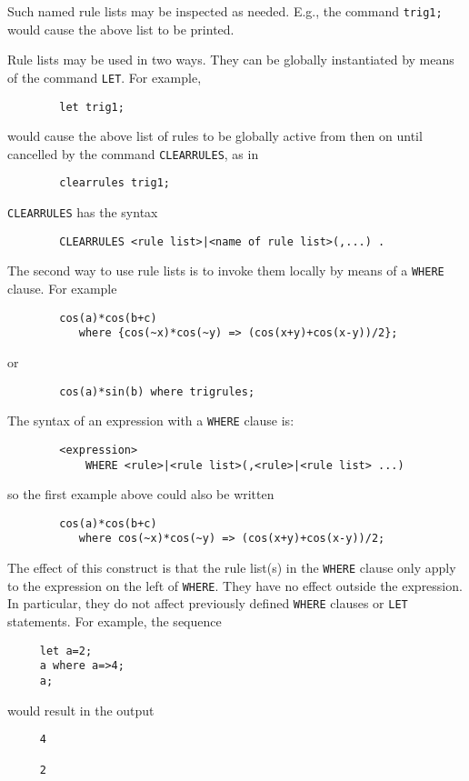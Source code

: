 Such named rule lists may be inspected as needed. E.g., the command
\texttt{trig1;} would cause the above list to be printed.

\hypertarget{CLEARRULES}{}
Rule lists may be used in two ways.  They can be globally instantiated by
means of the command \texttt{LET}. For example,
\begin{verbatim}
        let trig1;
\end{verbatim}
would cause the above list of rules to be globally active from then on until
cancelled by the command \texttt{CLEARRULES}, as in
\begin{verbatim}
        clearrules trig1;
\end{verbatim}
\texttt{CLEARRULES} has the syntax
\begin{verbatim}
        CLEARRULES <rule list>|<name of rule list>(,...) .
\end{verbatim}

\hypertarget{operator:WHERE}{}
The second way to use rule lists is to invoke them locally by means of a
\texttt{WHERE} clause.  For example
\begin{verbatim}
        cos(a)*cos(b+c)
           where {cos(~x)*cos(~y) => (cos(x+y)+cos(x-y))/2};
\end{verbatim}
or
\begin{verbatim}
        cos(a)*sin(b) where trigrules;
\end{verbatim}

The syntax of an expression with a \texttt{WHERE} clause is:
\begin{verbatim}
        <expression>
            WHERE <rule>|<rule list>(,<rule>|<rule list> ...)
\end{verbatim}
so the first example above could also be written
\begin{verbatim}
        cos(a)*cos(b+c)
           where cos(~x)*cos(~y) => (cos(x+y)+cos(x-y))/2;
\end{verbatim}

The effect of this construct is that the rule list(s) in the \texttt{WHERE}
clause only apply to the expression on the left of \texttt{WHERE}.  They have
no effect outside the expression.  In particular, they do not affect
previously defined \texttt{WHERE} clauses or \texttt{LET} statements.  For
example, the sequence
\begin{verbatim}
     let a=2;
     a where a=>4;
     a;
\end{verbatim}
would result in the output
\begin{verbatim}
     4

     2
\end{verbatim}

